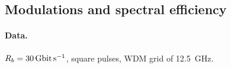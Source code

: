 
\subsection{Modulations and spectral efficiency}
\label{sec:2_1}
\paragraph{Data.} $R_b = \SI{30}{\giga\bit\per\second}$, square pulses, WDM grid of \SI{12.5}{\giga\hertz}.

